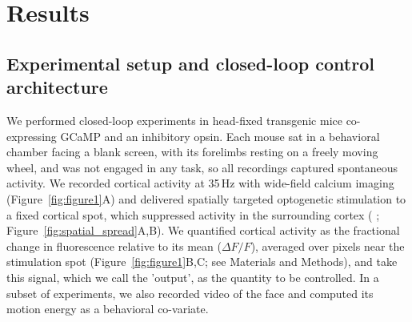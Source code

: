 
\section*{Results}
\subsection*{Experimental setup and closed-loop control architecture}
We performed closed-loop experiments in head-fixed transgenic mice co-expressing GCaMP and an inhibitory opsin.
Each mouse sat in a behavioral chamber facing a blank screen, with its forelimbs resting on a freely moving wheel, and was not engaged in any task, so all recordings captured spontaneous activity.
We recorded cortical activity at 35\,Hz with wide-field calcium imaging (Figure~\ref{fig:figure1}A) and delivered spatially targeted optogenetic stimulation to a fixed cortical spot, which suppressed activity in the surrounding cortex (\citep{Matveev2024} ; Figure~\ref{fig:spatial_spread}A,B).
We quantified cortical activity as the fractional change in fluorescence relative to its mean ($\Delta F/F$), averaged over pixels near the stimulation spot (Figure~\ref{fig:figure1}B,C; see Materials and Methods), and take this signal, which we call the 'output', as the quantity to be controlled.
In a subset of experiments, we also recorded video of the face and computed its motion energy as a behavioral co-variate.


